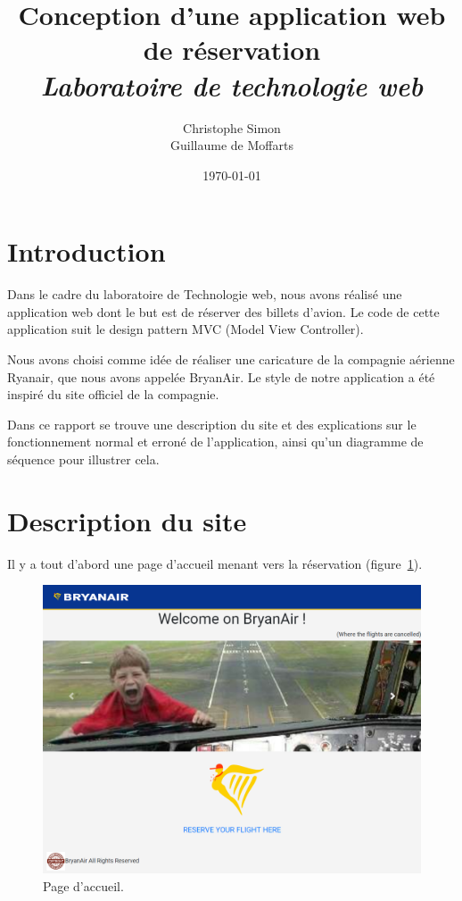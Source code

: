 \documentclass[12pt,a4paper]{article}
\title{Conception d'une application web de réservation\\[3mm] \normalsize{\it Laboratoire de technologie web}}
\author{Christophe Simon \\ Guillaume de Moffarts}
\date{\today}
\begin{document}
	\maketitle
	\section*{Introduction}
		Dans le cadre du laboratoire de Technologie web, nous avons réalisé une application web dont le but est de réserver des billets d'avion. Le code de cette application suit le design pattern MVC (Model View Controller).

		Nous avons choisi comme idée de réaliser une caricature de la compagnie aérienne Ryanair, que nous avons appelée BryanAir. Le style de notre application a été inspiré du site officiel de la compagnie.

		Dans ce rapport se trouve une description du site et des explications sur le fonctionnement normal et erroné de l'application, ainsi qu'un diagramme de séquence pour illustrer cela.


	\section{Description du site}
		Il y a tout d'abord une page d'accueil menant vers la réservation (figure~\ref{fig:home}).
		\begin{figure}[!p]
			\includegraphics[width=\textwidth]{home.png}
			\caption{Page d'accueil.}
			\label{fig:home}
		\end{figure}
\end{document}
